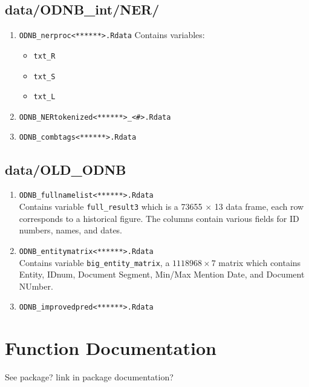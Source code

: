 \documentclass[11pt]{article}
\newcommand{\filename}[1]{\texttt{#1}}
\begin{document}
\subsection{data/ODNB\_int/NER/}
\begin{enumerate}
\item \filename{ODNB\_nerproc<******>.Rdata}
Contains variables: 
\begin{itemize}
\item \texttt{txt\_R}
\item \texttt{txt\_S}
\item \texttt{txt\_L}
\end{itemize}

\item \filename{ODNB\_NERtokenized<******>\_<\#>.Rdata}

\item \filename{ODNB\_combtags<******>.Rdata}
\end{enumerate}


\subsection{data/OLD\_ODNB}
\begin{enumerate}
\item \filename{ODNB\_fullnamelist<******>.Rdata} \\
Contains variable \texttt{full\_result3} which is a 73655 $\times$ 13 data frame, each row corresponds to a historical figure. The columns contain various fields for ID numbers, names, and dates. 

\item \filename{ODNB\_entitymatrix<******>.Rdata} \\
Contains variable \texttt{big\_entity\_matrix}, a $1118968 \times 7$ matrix which contains Entity, IDnum, Document Segment, Min/Max Mention Date, and Document NUmber. 

\item \filename{ODNB\_improvedpred<******>.Rdata} \\

\end{enumerate}


\section{Function Documentation}
See package? link in package documentation?
\end{document}
